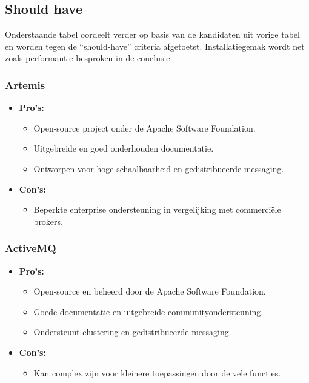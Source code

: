 \subsection{Should have} 
Onderstaande tabel oordeelt verder op basis van de kandidaten uit vorige tabel en worden tegen de ``should-have'' criteria afgetoetst.
Installatiegemak wordt net zoals performantie besproken in de conclusie.

\subsubsection{Artemis}
\begin{itemize}
    \item \textbf{Pro's:}
    \begin{itemize}
        \item Open-source project onder de Apache Software Foundation.
        \item Uitgebreide en goed onderhouden documentatie.
        \item Ontworpen voor hoge schaalbaarheid en gedistribueerde messaging.
    \end{itemize}
    \item \textbf{Con's:}
    \begin{itemize}
        \item Beperkte enterprise ondersteuning in vergelijking met commerciële brokers.
    \end{itemize}
\end{itemize}

\subsubsection{ActiveMQ}
\begin{itemize}
    \item \textbf{Pro's:}
    \begin{itemize}
        \item Open-source en beheerd door de Apache Software Foundation.
        \item Goede documentatie en uitgebreide communityondersteuning.
        \item Ondersteunt clustering en gedistribueerde messaging.
    \end{itemize}
    \item \textbf{Con's:}
    \begin{itemize}
        \item Kan complex zijn voor kleinere toepassingen door de vele functies.
    \end{itemize}
\end{itemize}

